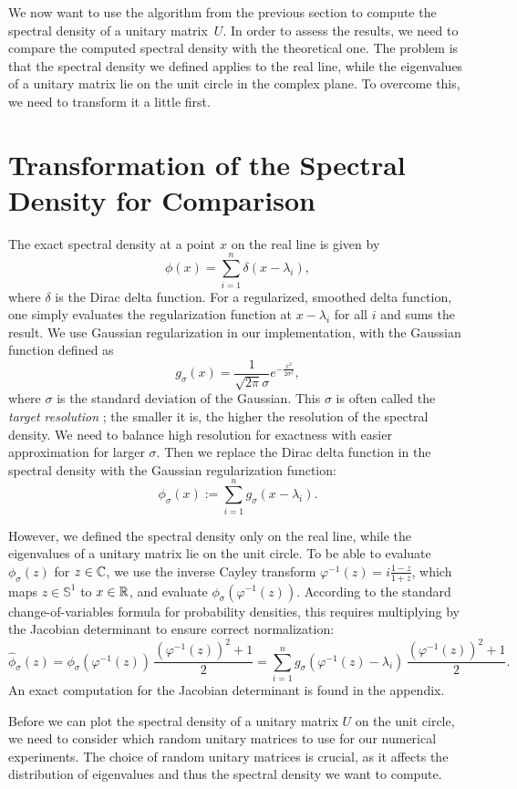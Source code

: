 We now want to use the algorithm from the previous section to compute the spectral density of a unitary matrix~$U$. In order to assess the results, we need to compare the computed spectral density with the theoretical one. The problem is that the spectral density we defined applies to the real line, while the eigenvalues of a unitary matrix lie on the unit circle in the complex plane. To overcome this, we need to transform it a little first.

\section{Transformation of the Spectral Density for Comparison}

The exact spectral density at a point $x$ on the real line is given by
\[
\phi(x) = \sum_{i=1}^n \delta(x - \lambda_i),
\]
where $\delta$ is the Dirac delta function. For a regularized, smoothed delta function, one simply evaluates the regularization function at $x - \lambda_i$ for all $i$ and sums the result. We use Gaussian regularization in our implementation, with the Gaussian function defined as
\[
    g_\sigma(x) = \frac{1}{\sqrt{2\pi} \sigma} e^{-\frac{x^2}{2\sigma^2}},
\]
where $\sigma$ is the standard deviation of the Gaussian. This $\sigma$ is often called the \emph{target resolution} \cite{linsaadyang14}; the smaller it is, the higher the resolution of the spectral density. We need to balance high resolution for exactness with easier approximation for larger $\sigma$.
Then we replace the Dirac delta function in the spectral density with the Gaussian regularization function:
\[
    \phi_\sigma(x) := \sum_{i=1}^n g_\sigma(x - \lambda_i).
\]


However, we defined the spectral density only on the real line, while the eigenvalues of a unitary matrix lie on the unit circle. To be able to evaluate $\phi_\sigma(z)$ for $z \in \mathbb{C}$, we use the inverse Cayley transform $\varphi^{-1}(z) = i\frac{1 - z}{1 + z}$, which maps $z \in \mathbb{S}^1$ to $x \in \mathbb{R}$, and evaluate $\phi_\sigma(\varphi^{-1}(z))$. According to the standard change-of-variables formula for probability densities, this requires multiplying by the Jacobian determinant to ensure correct normalization:
\[
    \hat{\phi}_\sigma(z) = \phi_\sigma(\varphi^{-1}(z)) \, \frac{(\varphi^{-1}(z))^2 + 1}{2} = \sum_{i=1}^n g_\sigma(\varphi^{-1}(z) - \lambda_i) \, \frac{(\varphi^{-1}(z))^2 + 1}{2}.
\]
An exact computation for the Jacobian determinant is found in the appendix.

Before we can plot the spectral density of a unitary matrix $U$ on the unit circle, we need to consider which random unitary matrices to use for our numerical experiments. The choice of random unitary matrices is crucial, as it affects the distribution of eigenvalues and thus the spectral density we want to compute.

